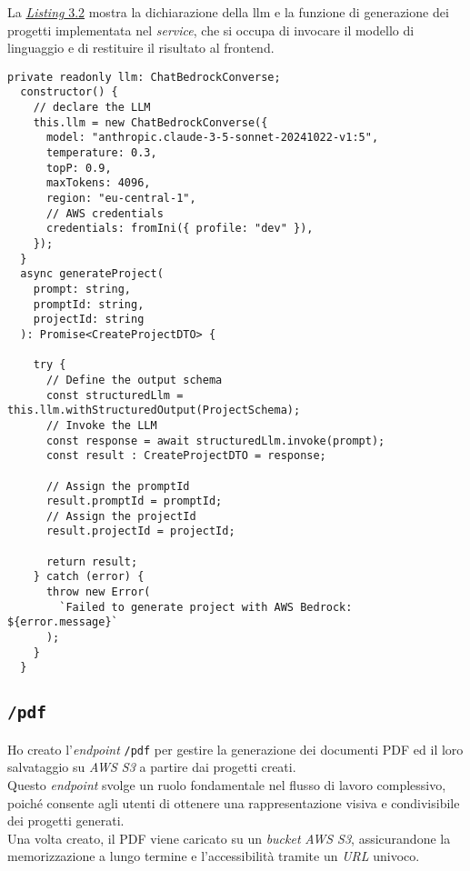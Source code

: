 \pagebreak
\noindent La {\hyperref[lst:funzione-generazione-progetto]{\textit{Listing} 3.2}} mostra la dichiarazione della \gls{llm} e la funzione di generazione dei progetti implementata nel \textit{service}, che si occupa di invocare il modello di linguaggio e di restituire il risultato al \gls{frontend}.

\begin{lstlisting}[caption={Dichiarazione \gls{llm} e sua invocazione}, label={lst:funzione-generazione-progetto}]
private readonly llm: ChatBedrockConverse;
  constructor() {  
    // declare the LLM
    this.llm = new ChatBedrockConverse({
      model: "anthropic.claude-3-5-sonnet-20241022-v1:5",
      temperature: 0.3,
      topP: 0.9,
      maxTokens: 4096,
      region: "eu-central-1",
      // AWS credentials
      credentials: fromIni({ profile: "dev" }), 
    });
  }
  async generateProject(
    prompt: string,
    promptId: string,
    projectId: string
  ): Promise<CreateProjectDTO> {

    try {
      // Define the output schema
      const structuredLlm = this.llm.withStructuredOutput(ProjectSchema); 
      // Invoke the LLM
      const response = await structuredLlm.invoke(prompt); 
      const result : CreateProjectDTO = response;

      // Assign the promptId
      result.promptId = promptId; 
      // Assign the projectId
      result.projectId = projectId; 

      return result;
    } catch (error) {
      throw new Error(
        `Failed to generate project with AWS Bedrock: ${error.message}`
      );
    }
  }
\end{lstlisting}
\pagebreak
\subsection*{\texttt{/pdf}}
Ho creato l'\textit{endpoint} \texttt{/pdf} per gestire la generazione dei documenti PDF ed il loro salvataggio su \textit{AWS S3} a partire dai progetti creati.\\
Questo \textit{endpoint} svolge un ruolo fondamentale nel flusso di lavoro complessivo, poiché consente agli utenti di ottenere una rappresentazione visiva e condivisibile dei progetti generati.\\
Una volta creato, il PDF viene caricato su un \textit{bucket} \textit{AWS S3}, assicurandone la memorizzazione a lungo termine e l’accessibilità tramite un \textit{URL} univoco.\\ 

